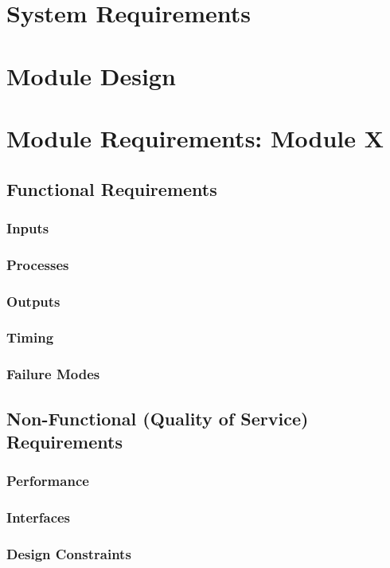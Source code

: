 \documentclass[10pt,a4paper]{report}
\begin{document}
\section{System Requirements}

\section{Module Design}

\section{Module Requirements: Module X}
\subsection{Functional Requirements}
\subsubsection{Inputs}
\subsubsection{Processes}
\subsubsection{Outputs}
\subsubsection{Timing}
\subsubsection{Failure Modes}

\subsection{Non-Functional (Quality of Service) Requirements}
\subsubsection{Performance}
\subsubsection{Interfaces}
\subsubsection{Design Constraints}
\end{document}
